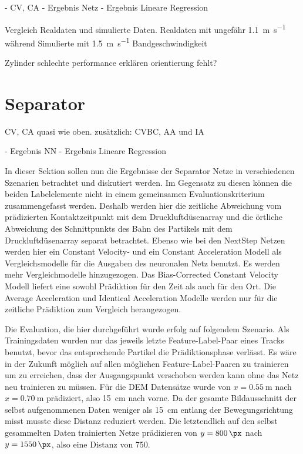 \color{blue}
- CV, CA
- Ergebnis Netz
- Ergebnis Lineare Regression


Vergleich Realdaten und simulierte Daten.
Realdaten mit ungefähr \SI{1.1}{\meter\per\second} während Simulierte mit \SI{1.5}{\metre\per\second} Bandgeschwindigkeit 

Zylinder schlechte performance erklären \textrightarrow orientierung fehlt?
\color{black}

\section{Separator}

\color{blue}
CV, CA quasi wie oben.
zusätzlich: CVBC, AA und IA

- Ergebnis NN
- Ergebnis Lineare Regression
\color{black}



In dieser Sektion sollen nun die Ergebnisse der Separator Netze in verschiedenen Szenarien betrachtet und diskutiert werden.
Im Gegensatz zu diesen können die beiden Labelelemente nicht in einem gemeinsamen Evaluationskriterium zusammengefasst werden.
Deshalb werden hier die zeitliche Abweichung vom prädizierten Kontaktzeitpunkt mit dem Druckluftdüsenarray und die örtliche Abweichung des Schnittpunkts des Bahn des Partikels mit dem Druckluftdüsenarray separat betrachtet.
Ebenso wie bei den NextStep Netzen werden hier ein Constant Velocity- und ein Constant Acceleration Modell als Vergleichsmodelle für die Ausgaben des neuronalen Netz benutzt.
Es werden mehr Vergleichmodelle hinzugezogen. 
Das Bias-Corrected Constant Velocity Modell liefert eine sowohl Prädiktion für den Zeit als auch für den Ort.
Die Average Acceleration und Identical Acceleration Modelle werden nur für die zeitliche Prädiktion zum Vergleich herangezogen.

Die Evaluation, die hier durchgeführt wurde erfolg auf folgendem Szenario.
Als Trainingsdaten wurden nur das jeweils letzte Feature-Label-Paar eines Tracks benutzt, bevor das entsprechende Partikel die Prädiktionsphase verlässt.
Es wäre in der Zukunft möglich auf allen möglichen Feature-Label-Paaren zu trainieren um zu erreichen, dass der Ausgangspunkt verschoben werden kann ohne das Netz neu trainieren zu müssen.
Für die DEM Datensätze wurde von \(x = \SI{0.55}{\meter}\) nach \(x = \SI{0.70}{\meter}\) prädiziert, also \SI{15}{\centi\meter} nach vorne.
Da der gesamte Bildausschnitt der selbst aufgenommenen Daten weniger als \SI{15}{\centi\meter} entlang der Bewegungsrichtung misst musste diese Distanz reduziert werden.
Die letztendlich auf den selbst gesammelten Daten trainierten Netze prädizieren von \(y = \SI{800}{\px}\) nach \(y = \SI{1550}{\px}\), also eine Distanz von \SI{750}{\px}.




